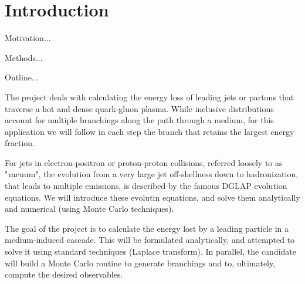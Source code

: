 \documentclass[main.tex]{subfiles}
\begin{document}
\chapter*{Introduction}\label{cpt:intro}

Motivation...

Methods...

Outline...

        
The project deals with calculating the energy loss of leading jets or partons that traverse a hot and dense quark-gluon plasma. While inclusive distributions account for multiple branchings along the path through a medium, for this application we will follow in each step the branch that retains the largest energy fraction.

For jets in electron-positron or proton-proton collisions, referred loosely to as "vacuum", the evolution from a very large jet off-shellness down to hadronization, that leads to multiple emissions, is described by the famous DGLAP evolution equations. We will introduce these evolutin equations, and solve them analytically and numerical (using Monte Carlo techniques).

The goal of the project is to calculate the energy lost by a leading particle in a medium-induced cascade. This will be formulated analytically, and attempted to solve it using standard techniques (Laplace transform). In parallel, the candidate will build a Monte Carlo routine to generate branchings and to, ultimately, compute the desired observables.

\end{document}

